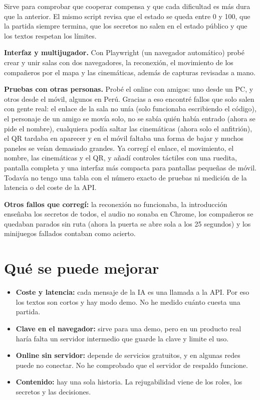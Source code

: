 \documentclass[11pt,a4paper]{article}
\begin{document}
Sirve para comprobar que cooperar compensa y que cada dificultad es más dura que la anterior. El mismo script revisa que el estado se queda entre 0 y 100, que la partida siempre termina, que los secretos no salen en el estado público y que los textos respetan los límites.

\textbf{Interfaz y multijugador.} Con Playwright (un navegador automático) probé crear y unir salas con dos navegadores, la reconexión, el movimiento de los compañeros por el mapa y las cinemáticas, además de capturas revisadas a mano.

\textbf{Pruebas con otras personas.} Probé el online con amigos: uno desde un PC, y otros desde el móvil, algunos en Perú. Gracias a eso encontré fallos que solo salen con gente real: el enlace de la sala no unía (solo funcionaba escribiendo el código), el personaje de un amigo se movía solo, no se sabía quién había entrado (ahora se pide el nombre), cualquiera podía saltar las cinemáticas (ahora solo el anfitrión), el QR tardaba en aparecer y en el móvil faltaba una forma de bajar y muchos paneles se veían demasiado grandes. Ya corregí el enlace, el movimiento, el nombre, las cinemáticas y el QR, y añadí controles táctiles con una ruedita, pantalla completa y una interfaz más compacta para pantallas pequeñas de móvil. Todavía no tengo una tabla con el número exacto de pruebas ni medición de la latencia o del coste de la API.

\textbf{Otros fallos que corregí:} la reconexión no funcionaba, la introducción enseñaba los secretos de todos, el audio no sonaba en Chrome, los compañeros se quedaban parados sin ruta (ahora la puerta se abre sola a los 25 segundos) y los minijuegos fallados contaban como acierto.

\section{Qué se puede mejorar}
\begin{itemize}
\item \textbf{Coste y latencia:} cada mensaje de la IA es una llamada a la API. Por eso los textos son cortos y hay modo demo. No he medido cuánto cuesta una partida.
\item \textbf{Clave en el navegador:} sirve para una demo, pero en un producto real haría falta un servidor intermedio que guarde la clave y limite el uso.
\item \textbf{Online sin servidor:} depende de servicios gratuitos, y en algunas redes puede no conectar. No he comprobado que el servidor de respaldo funcione.
\item \textbf{Contenido:} hay una sola historia. La rejugabilidad viene de los roles, los secretos y las decisiones.
\end{itemize}
\end{document}
